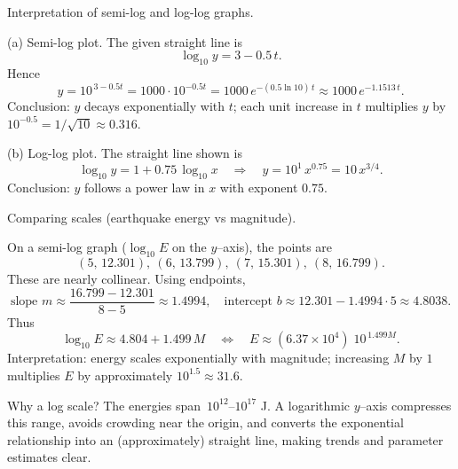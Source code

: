 \documentclass[11pt]{article}
\def\textbf#1{#1}%
\begin{document}
\begin{solution}
\textbf{Interpretation of semi-log and log-log graphs.}

\textbf{(a) Semi-log plot.} The given straight line is
\[
\log_{10} y = 3 - 0.5\,t.
\]
Hence
\[
y = 10^{\,3-0.5t}=1000\cdot 10^{-0.5t}
= 1000\,e^{-(0.5\ln 10)\,t} \approx 1000\,e^{-1.1513\,t}.
\]
Conclusion: $y$ decays exponentially with $t$; each unit increase in $t$ multiplies $y$ by $10^{-0.5}=1/\sqrt{10}\approx 0.316$.

\textbf{(b) Log-log plot.} The straight line shown is
\[
\log_{10}y = 1 + 0.75\,\log_{10}x
\quad\Longrightarrow\quad
y = 10^{1}\,x^{0.75}=10\,x^{3/4}.
\]
Conclusion: $y$ follows a power law in $x$ with exponent $0.75$.
\end{solution}


\begin{solution}
\textbf{Comparing scales (earthquake energy vs magnitude).}

On a semi-log graph ($\log_{10}E$ on the $y$–axis), the points are
\[
(5,\,12.301),\ (6,\,13.799),\ (7,\,15.301),\ (8,\,16.799).
\]
These are nearly collinear. Using endpoints,
\[
\text{slope } m \approx \frac{16.799-12.301}{8-5} \approx 1.4994,
\quad
\text{intercept } b \approx 12.301 - 1.4994\cdot 5 \approx 4.8038.
\]
Thus
\[
\log_{10}E \approx 4.804 + 1.499\,M
\quad\Longleftrightarrow\quad
E \approx (6.37\times 10^{4})\;10^{\,1.499 M}.
\]
Interpretation: energy scales exponentially with magnitude; increasing $M$ by $1$ multiplies $E$ by approximately $10^{1.5}\approx 31.6$.

\begin{center}
\end{center}

\textbf{Why a log scale?} The energies span \,$10^{12}$–$10^{17}$ J. A logarithmic $y$–axis compresses this range, avoids crowding near the origin, and converts the exponential relationship into an (approximately) straight line, making trends and parameter estimates clear.
\end{solution}
\end{document}
